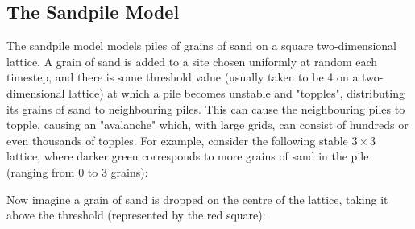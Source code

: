 \documentclass{article}
\begin{document}
\subsection{The Sandpile Model}
The sandpile model models piles of grains of sand on a square two-dimensional lattice. A grain of sand is added to a site chosen uniformly at random each timestep, and there is some threshold value (usually taken to be 4 on a two-dimensional lattice) at which a pile becomes unstable and "topples", distributing its grains of sand to neighbouring piles. This can cause the neighbouring piles to topple, causing an "avalanche" which, with large grids, can consist of hundreds or even thousands of topples. For example, consider the following stable $3 \times 3$ lattice, where darker green corresponds to more grains of sand in the pile (ranging from 0 to 3 grains):
\begin{center}
\end{center}
Now imagine a grain of sand is dropped on the centre of the lattice, taking it above the threshold (represented by the red square):
\begin{center}
\end{center}
\end{document}
